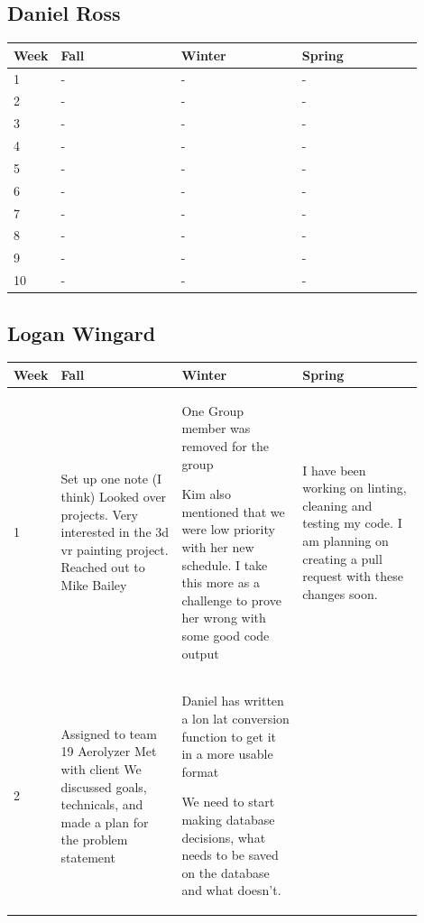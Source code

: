 \documentclass[onecolumn, draftclsnofoot,10pt, compsoc]{IEEEtran}
\begin{document}
\begin{singlespace}
		\subsection{Daniel Ross}
			\begin{longtable}{|l|p{0.3\linewidth}|p{0.3\linewidth}|p{0.3\linewidth}|}\hline \textbf{Week} & \textbf{Fall} & \textbf{Winter} & \textbf{Spring}\\\hline
			1 & - & - & -
			\\\hline
			2 & - & - & -
			\\\hline
			3 & - & - & -
			\\\hline
			4 & - & - & -
			\\\hline
			5 & - & - & -
			\\\hline
			6 & - & - & -
			\\\hline
			7 & - & - & -
			\\\hline
			8 & - & - & -
			\\\hline
			9 & - & - & -
			\\\hline
			10 & - & - & -
			\\\hline
			
			\end{longtable}
		\subsection{Logan Wingard}
			\begin{longtable}{|l|p{0.3\linewidth}|p{0.3\linewidth}|p{0.3\linewidth}|}\hline \textbf{Week} & \textbf{Fall} & \textbf{Winter} & \textbf{Spring}\\\hline
			1 &
			Set up one note (I think) 
			Looked over projects. Very interested in the 3d vr painting project.
			Reached out to Mike Bailey & One Group member was removed for the group

Kim also mentioned that we were low priority with her new schedule. 
I take this more as a challenge to prove her wrong with some good code output & I have been working on linting, cleaning and testing my code.
I am planning on creating a pull request with these changes soon.
			\\\hline
			2 & 
			Assigned to team 19 Aerolyzer
			Met with client 
			We discussed goals, technicals, and made a plan for the problem statement  & Daniel has written a lon lat conversion function to get it in a more usable format

We need to start making database decisions, what needs to be saved on the database and what doesn't.


\end{longtable}
\end{singlespace}
\end{document}
